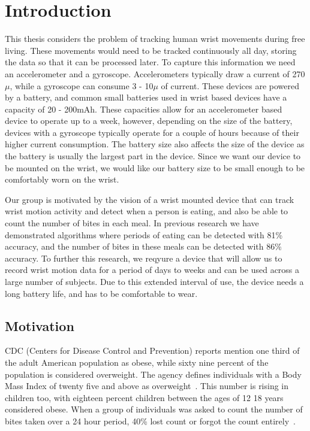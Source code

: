 
\chapter{Introduction}
\label{Chap:Intro}
This thesis considers the problem of tracking human wrist movements during free living.
These movements would need to be tracked continuously all day,
storing the data so that it can be processed later.
To capture this information we need an accelerometer and a gyroscope.
Accelerometers typically draw a current of 270$\mu$,
while a gyroscope can consume 3 - 10$\mu$ of current.
These devices are powered by a battery,
and common small batteries used in wrist based devices have a capacity of 20 - 200mAh.
These capacities allow for an accelerometer based device to operate up to a week,
however, depending on the size of the battery,
devices with a gyroscope typically operate for a couple of hours because of their higher current consumption.
The battery size also affects the size of the device as the battery is usually the largest part in the device.
Since we want our device to be mounted on the wrist,
we would like our battery size to be small enough to be comfortably worn on the wrist.

Our group is motivated by the vision of a wrist mounted device that can track wrist motion activity and
detect when a person is eating,
and also be able to count the number of bites in each meal.
In previous research we have demonstrated algorithms where periods of eating can be detected with 81\% accuracy,
and the number of bites in these meals can be detected with 86\% accuracy.
To further this research,
we reqyure a device that will allow us to record wrist motion data for a period of days to weeks and can be used across a large number of subjects.
Due to this extended interval of use,
the device needs a long battery life,
and has to be comfortable to wear.


\section{Motivation}
\label{Sec:Motivation}

 CDC (Centers for Disease Control and Prevention) reports mention one
 \textemdash{} third of the adult American population as 
 obese, while sixty nine percent of the population is considered 
 overweight. The agency defines individuals with a Body Mass
 Index of twenty five and above as overweight~\cite{ogden2010prevalence}.
 This number is rising in children too, with eighteen
 percent children between the ages of 12 \textemdash{} 18
 years considered obese. When a group
 of individuals was asked to count the number of bites taken over
 a 24 hour period, 40\% lost count or forgot the count entirely~\cite{mahoney1975obese}.

